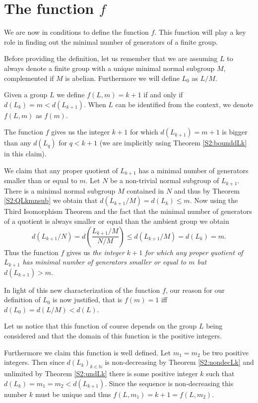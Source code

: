 \section{The function \texorpdfstring{$f$}{f}}

We are now in conditions to define the function $f$. This function will play a key role in finding out the minimal number of generators of a finite group.

Before providing the definition, let us remember that we are assuming $L$ to always denote a finite group with a unique minimal normal subgroup $M$, complemented if $M$ is abelian. Furthermore we will define $L_0$ as $L/M$.

\begin{definition}
    Given a group $L$ we define $f(L, m) = k+1$ if and only if $d(L_k) = m < d(L_{k+1})$. When $L$ can be identified from the context, we denote $f(L,m)$ as $f(m)$.
\end{definition}

The function $f$ gives us the integer $k+1$ for which $d(L_{k+1}) = m + 1$ is bigger than any $d(L_q)$ for $q < k+1$ (we are implicitly using Theorem \ref{S2:bounddLk} in this claim). 

We claim that any proper quotient of $L_{k+1}$ has a minimal number of generators smaller than or equal to $m$. 
Let $N$ be a non-trivial normal subgroup of $L_{k+1}$. 
There is a minimal normal subgroup $M$ contained in $N$ and  thus by Theorem \ref{S2:QLkmnsub} we obtain that $d(L_{k+1} / M) = d(L_k) \le m$. 
Now using the Third Isomorphism Theorem and the fact that the minimal number of generators of a quotient is always smaller or equal than the ambient group we obtain
$$
d(L_{k+1}/N) = d(\frac{L_{k+1}/M}{N/M}) \le d(L_{k+1} / M) = d(L_k) = m.
$$
Thus the function $f$ gives us \textit{the integer $k+1$ for which any proper quotient of $L_{k+1}$ has minimal number of generators smaller or equal to $m$ but $d(L_{k+1}) > m$.}

In light of this new characterization of the function $f$, our reason for our definition of $L_0$ is now justified, that is $f(m) = 1$ iff $d(L_0) = d(L/M) < d(L)$. 

Let us notice that this function of course depends on the group $L$ being considered and that the domain of this function is the positive integers. 

Furthermore we claim this function is well defined. Let $m_1 = m_2$ be two positive integers. Then since $d(L_k)_{k \in \mathbb{N}}$ is non-decreasing by Theorem \ref{S2:nondecLk} and unlimited by Theorem \ref{S2:undLk} there is some positive integer $k$ such that $d(L_k) = m_1 = m_2 < d(L_{k+1})$. Since the sequence is non-decreasing this number $k$ must be unique and thus $f(L,m_1) = k+1 = f(L,m_2)$.